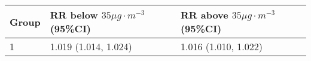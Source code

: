 \begin{tabular}{lll}
  \hline
Group & RR below $35 \mu g \cdot m^{-3}$ (95\%CI) & RR above $35 \mu g \cdot m^{-3}$ (95\%CI) \\ 
  \hline
   1 & 1.019 (1.014, 1.024) & 1.016 (1.010, 1.022) \\ 
   \hline
\end{tabular}

